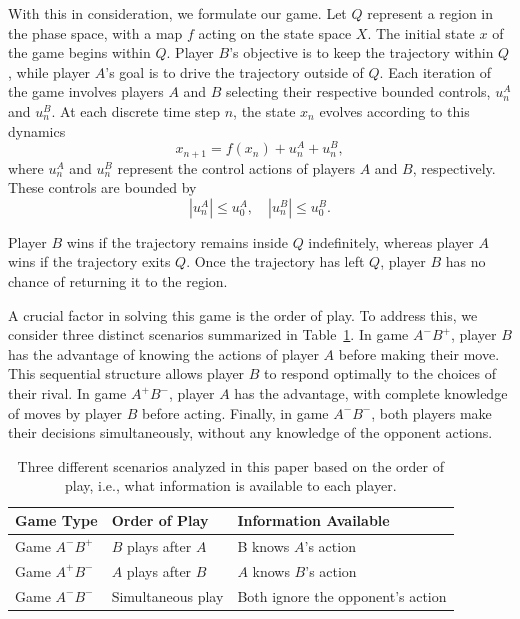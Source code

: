 With this in consideration, we formulate our game. Let $Q$ represent a region in the phase space, with a map $f$ acting on the state space $X$. The initial state $x$ of the game begins within $Q$. Player $B$'s objective is to keep the trajectory within $Q$, while player $A$'s goal is to drive the trajectory outside of $Q$. Each iteration of the game involves players $A$ and $B$ selecting their respective bounded controls, $u_n^A$ and $u_n^B$. At each discrete time step $n$, the state $x_n$ evolves according to this dynamics
\begin{equation}
    x_{n+1} = f(x_n) + u_n^A + u_n^B,
\end{equation}
where $u_n^A $ and $u_n^B $ represent the control actions of players $A$ and $B$, respectively. These controls are bounded by
\begin{equation}
    |u_n^A| \leq u_0^A, \quad |u_n^B| \leq u_0^B.
\end{equation}


Player $B$ wins if the trajectory remains inside $Q$ indefinitely, whereas player $A$ wins if the trajectory exits $Q$. Once the trajectory has left $Q$, player $B$ has no chance of returning it to the region.

A crucial factor in solving this game is the order of play. To address this, we consider three distinct scenarios summarized in Table~\ref{tab:games}. In game $A^{-}B^{+}$, player $B$ has the advantage of knowing the actions of player $A$ before making their move. This sequential structure allows player $B$ to respond optimally to the choices of their rival. In game $A^{+}B^{-}$, player $A$ has the advantage, with complete knowledge of moves by player $B$ before acting. Finally, in game $A^{-}B^{-}$, both players make their decisions simultaneously, without any knowledge of the opponent actions.  



\begin{table}[h!]
\centering
\begin{tabular}{|p{3cm}|p{4cm}|p{6cm}|}
\hline
\textbf{Game Type} & \textbf{Order of Play} & \textbf{Information Available} \\
\hline
Game $A^{-}B^{+}$ & $B$ plays after $A$ & B knows $A$'s action  \\
\hline
Game $A^{+}B^{-}$ & $A$ plays after $B$ & $A$ knows $B$'s action  \\
\hline
Game $A^{-}B^{-}$ & Simultaneous play & Both ignore the opponent's action  \\
\hline
\end{tabular}
\caption{Three different scenarios analyzed in this paper based on the order of play, i.e., what information is available to each player.}
\label{tab:games}
\end{table}











